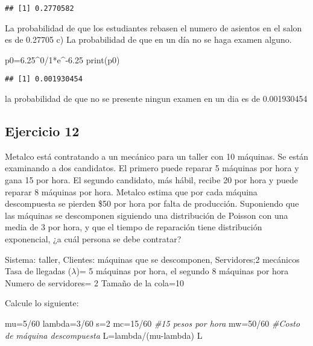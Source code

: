 \documentclass[
]{article}
\newenvironment{Shaded}{\begin{snugshade}}{\end{snugshade}}
\newcommand{\CommentTok}[1]{\textcolor[rgb]{0.56,0.35,0.01}{\textit{#1}}}
\newcommand{\DecValTok}[1]{\textcolor[rgb]{0.00,0.00,0.81}{#1}}
\newcommand{\FloatTok}[1]{\textcolor[rgb]{0.00,0.00,0.81}{#1}}
\newcommand{\FunctionTok}[1]{\textcolor[rgb]{0.00,0.00,0.00}{#1}}
\newcommand{\NormalTok}[1]{#1}
\newcommand{\OtherTok}[1]{\textcolor[rgb]{0.56,0.35,0.01}{#1}}
\newcommand{\SpecialCharTok}[1]{\textcolor[rgb]{0.00,0.00,0.00}{#1}}
\begin{document}
\begin{verbatim}
## [1] 0.2770582
\end{verbatim}

La probabilidad de que los estudiantes rebasen el numero de asientos en
el salon es de 0.27705 c) La probabilidad de que en un día no se haga
examen alguno.

\begin{Shaded}
\begin{Highlighting}[]
\NormalTok{p0}\OtherTok{=}\FloatTok{6.25}\SpecialCharTok{\^{}}\DecValTok{0}\SpecialCharTok{/}\DecValTok{1}\SpecialCharTok{*}\NormalTok{e}\SpecialCharTok{\^{}{-}}\FloatTok{6.25}
\FunctionTok{print}\NormalTok{(p0)}
\end{Highlighting}
\end{Shaded}

\begin{verbatim}
## [1] 0.001930454
\end{verbatim}

la probabilidad de que no se presente ningun examen en un dia es de
0.001930454

\hypertarget{ejercicio-12}{%
\subsection{Ejercicio 12}\label{ejercicio-12}}

Metalco está contratando a un mecánico para un taller con 10 máquinas.
Se están examinando a dos candidatos. El primero puede reparar 5
máquinas por hora y gana 15 por hora. El segundo candidato, más hábil,
recibe 20 por hora y puede reparar 8 máquinas por hora. Metalco estima
que por cada máquina descompuesta se pierden \$50 por hora por falta de
producción. Suponiendo que las máquinas se descomponen siguiendo una
distribución de Poisson con una media de 3 por hora, y que el tiempo de
reparación tiene distribución exponencial, ¿a cuál persona se debe
contratar?

Sistema: taller, Clientes: máquinas que se descomponen, Servidores;2
mecánicos Tasa de llegadas (\(\lambda\))= 5 máquinas por hora, el
segundo 8 máquinas por hora Numero de servidores= 2 Tamaño de la cola=10

Calcule lo siguiente:

\begin{Shaded}
\begin{Highlighting}[]
\NormalTok{mu}\OtherTok{=}\DecValTok{5}\SpecialCharTok{/}\DecValTok{60}
\NormalTok{lambda}\OtherTok{=}\DecValTok{3}\SpecialCharTok{/}\DecValTok{60}
\NormalTok{s}\OtherTok{=}\DecValTok{2}
\NormalTok{mc}\OtherTok{=}\DecValTok{15}\SpecialCharTok{/}\DecValTok{60} \CommentTok{\#15 pesos por hora}
\NormalTok{mw}\OtherTok{=}\DecValTok{50}\SpecialCharTok{/}\DecValTok{60}  \CommentTok{\#Costo de máquina descompuesta}
\NormalTok{L}\OtherTok{=}\NormalTok{lambda}\SpecialCharTok{/}\NormalTok{(mu}\SpecialCharTok{{-}}\NormalTok{lambda)}
\NormalTok{L}
\end{Highlighting}
\end{Shaded}
\end{document}
